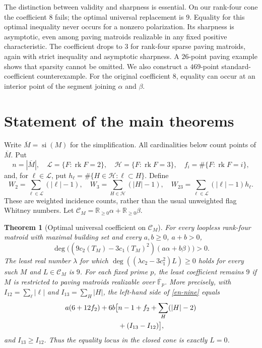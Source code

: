 \documentclass[12pt]{amsart}
\newtheorem{thm}{Theorem}[section]
\theoremstyle{definition}
\theoremstyle{remark}
\numberwithin{equation}{section}
\newcommand{\rk}{\operatorname{rk}}
\newcommand{\R}{\mathbb{R}}
\begin{document}
The distinction between validity and sharpness is essential. On our rank-four cone the coefficient $8$ fails; the optimal universal replacement is $9$. Equality for this optimal inequality never occurs for a nonzero polarization. Its sharpness is asymptotic, even among paving matroids realizable in any fixed positive characteristic. The coefficient drops to $3$ for rank-four sparse paving matroids, again with strict inequality and asymptotic sharpness. A $26$-point paving example shows that sparsity cannot be omitted. We also construct a $469$-point standard-coefficient counterexample. For the original coefficient $8$, equality can occur at an interior point of the segment joining $\alpha$ and $\beta$.

\section{Statement of the main theorems}
Write $\overline M=\operatorname{si}(M)$ for the simplification. All cardinalities below count points of $\overline M$. Put
\[
 n=|\overline M|,\quad \mathscr L=\{F:\rk F=2\},\quad
 \mathscr H=\{F:\rk F=3\},\quad f_i=\#\{F:\rk F=i\},
\]
and, for $\ell\in\mathscr L$, put $h_\ell=\#\{H\in\mathscr H:\ell\subset H\}$. Define
\begin{equation}\label{en-weights}
 W_2=\sum_{\ell\in\mathscr L}(|\ell|-1),\quad
 W_3=\sum_{H\in\mathscr H}(|H|-1),\quad
 W_{23}=\sum_{\ell\in\mathscr L}(|\ell|-1)h_\ell.
\end{equation}
These are weighted incidence counts, rather than the usual unweighted flag Whitney numbers. Let $\mathscr C_M=\R_{\geq0}\alpha+\R_{\geq0}\beta$.

\begin{thm}[Optimal universal coefficient on $\mathscr C_M$]\label{en-main}
For every loopless rank-four matroid with maximal building set and every $a,b\geq0$, $a+b>0$,
\begin{equation}\label{en-nine}
 \deg\bigl((9c_2(T_M)-3c_1(T_M)^2)(a\alpha+b\beta)\bigr)>0.
\end{equation}
The least real number $\lambda$ for which
$\deg((\lambda c_2-3c_1^2)L)\geq0$ holds for every such $M$ and $L\in\mathscr C_M$ is $9$.
For each fixed prime $p$, the least coefficient remains $9$ if $M$ is restricted to paving matroids realizable over $\overline{\mathbb F}_p$.
More precisely, with $I_{12}=\sum_\ell|\ell|$ and $I_{13}=\sum_H|H|$, the left-hand side of \eqref{en-nine} equals
\begin{align}\label{en-certificate}
 a(6+12f_2)+6b\bigl[&n-1+f_2+\sum_H(|H|-2)\notag\\
                  &+(I_{13}-I_{12})\bigr],
\end{align}
and $I_{13}\geq I_{12}$. Thus the equality locus in the closed cone is exactly $L=0$.
\end{thm}
\end{document}
